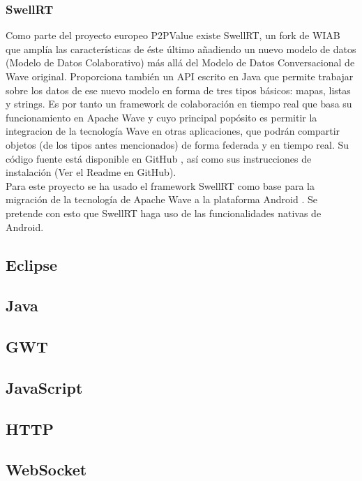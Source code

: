     \subsubsection{SwellRT}\label{sssec:swellRT}
    
    Como parte del proyecto europeo P2PValue \cite{ref:p2pvalue} existe SwellRT, un fork de WIAB que amplía las características de éste último añadiendo un nuevo modelo de datos (Modelo de Datos Colaborativo) más allá del Modelo de Datos Conversacional de Wave original. Proporciona también un API escrito en Java que permite trabajar sobre los datos de ese nuevo modelo en forma de tres tipos básicos: mapas, listas y strings. Es por tanto un framework de colaboración en tiempo real que basa su funcionamiento en Apache Wave y cuyo principal popósito es permitir la integracion de la tecnología Wave en otras aplicaciones, que podrán compartir objetos (de los tipos antes mencionados) de forma federada y en tiempo real. Su código fuente está disponible en GitHub \cite{ref:swellRT_github}, así como sus instrucciones de instalación (Ver el Readme en GitHub).\\[.2cm]

    Para este proyecto se ha usado el framework SwellRT como base para la migración de la tecnología de Apache Wave a la plataforma Android \cite{ref:android_platform}. Se pretende con esto que SwellRT haga uso de las funcionalidades nativas de Android.
    
    \subsection{Eclipse}\label{ssec:eclipse} 
    \subsection{Java}\label{ssec:java}
    \subsection{GWT}\label{ssec:gwt}
    \subsection{JavaScript}\label{ssec:javascript}
    \subsection{HTTP}\label{ssec:http}
    \subsection{WebSocket}\label{ssec:websocket}
